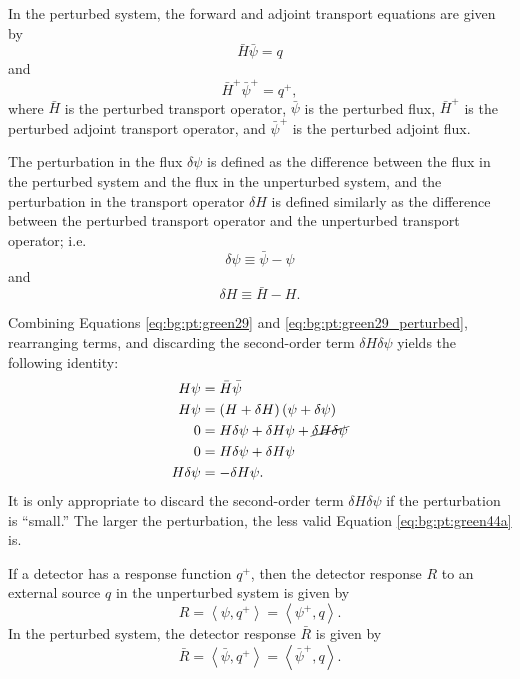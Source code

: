 In the perturbed system, the forward and adjoint transport equations are given by
\begin{equation}\label{eq:bg:pt:green29_perturbed}
  \bar{H}\bar{\psi} = q
\end{equation}
and
\begin{equation}\label{eq:bg:pt:green163_perturbed}
  \bar{H}^+\bar{\psi}^+ = q^+,
\end{equation}
where $\bar{H}$ is the perturbed transport operator, $\bar{\psi}$ is the perturbed flux, $\bar{H}^+$ is the perturbed adjoint transport operator, and $\bar{\psi}^+$ is the perturbed adjoint flux.

The perturbation in the flux $\delta\psi$ is defined as the difference between the flux in the perturbed system and the flux in the unperturbed system, and the perturbation in the transport operator $\delta H$ is defined similarly as the difference between the perturbed transport operator and the unperturbed transport operator; i.e.
\begin{equation}\label{eq:bg:pt:delta_psi}
  \delta \psi \equiv \bar{\psi} - \psi
\end{equation}
and
\begin{equation}\label{eq:bg:pt:delta_H}
  \delta H \equiv \bar{H} - H.
\end{equation}

Combining Equations \ref{eq:bg:pt:green29} and \ref{eq:bg:pt:green29_perturbed}, rearranging terms, and discarding the second-order term $\delta H\delta\psi$ yields the following identity:
\begin{equation}\label{eq:bg:pt:green44a}\begin{split}
  H\psi       & = \bar{H}\bar{\psi} \\
  H\psi       & = \left(H+\delta H\right)\left(\psi+\delta\psi\right) \\
  0           & = H\delta\psi + \delta H\psi + \cancel{\delta H\delta\psi} \\
  0           & = H\delta\psi + \delta H\psi \\
  H\delta\psi & = -\delta H\psi.
\end{split}\end{equation}
It is only appropriate to discard the second-order term $\delta H\delta\psi$ if the perturbation is ``small.''
The larger the perturbation, the less valid Equation \ref{eq:bg:pt:green44a} is.

If a detector has a response function $q^+$, then the detector response $R$ to an external source $q$ in the unperturbed system is given by
\begin{equation}\label{eq:bg:pt:green168}
  R = \left<\psi,q^+\right>
    = \left<\psi^+,q\right>.
\end{equation}
In the perturbed system, the detector response $\bar{R}$ is given by
\begin{equation}\label{eq:bg:pt:r_bar}
  \bar{R} = \left<\bar{\psi},q^+\right>
          = \left<\bar{\psi}^+,q\right>.
\end{equation}

